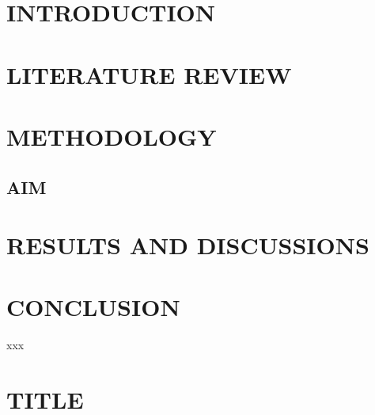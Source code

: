\documentclass[12pt,a4paper,oneside]{report}
\begin{document}
\clearpage
{}
\chapter{INTRODUCTION}
 \cite{sutton2016rocket}
 
\newpage
\chapter{LITERATURE REVIEW}


\newpage
\chapter{METHODOLOGY}
\section{AIM}
 
\newpage
\chapter{RESULTS AND DISCUSSIONS}

 
\newpage
\chapter{CONCLUSION}
xxx
\newpage


\appendix
\chapter{TITLE}
\end{document}
